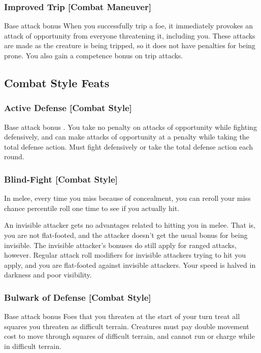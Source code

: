 \subsubsection{Improved Trip [Combat Maneuver]}
 Base attack bonus 
 When you successfully trip a foe, it immediately provokes an attack of opportunity from everyone threatening it, including you. These attacks are made as the creature is being tripped, so it does not have penalties for being prone. You also gain a  competence bonus on trip attacks.

\subsection{Combat Style Feats}

\subsubsection{Active Defense [Combat Style]}
 Base attack bonus .
 You take no penalty on attacks of opportunity while fighting defensively, and can make attacks of opportunity at a  penalty while taking the total defense action.
 Must fight defensively or take the total defense action each round.

\subsubsection{Blind-Fight [Combat Style]}
 In melee, every time you miss because of concealment, you can reroll your miss chance percentile roll one time to see if you actually hit.
\par An invisible attacker gets no advantages related to hitting you in melee. That is, you are not flat-footed, and the attacker doesn't get the usual  bonus for being invisible. The invisible attacker's bonuses do still apply for ranged attacks, however.
 Regular attack roll modifiers for invisible attackers trying to hit you apply, and you are flat-footed against invisible attackers. Your speed is halved in darkness and poor visibility.

\subsubsection{Bulwark of Defense [Combat Style]}
 Base attack bonus 
 Foes that you threaten at the start of your turn treat all squares you threaten as difficult terrain. Creatures must pay double movement cost to move through squares of difficult terrain, and cannot run or charge while in difficult terrain.

